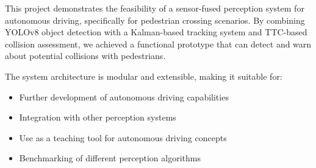 This project demonstrates the feasibility of a sensor-fused perception system for autonomous driving, specifically for pedestrian crossing scenarios. By combining YOLOv8 object detection with a Kalman-based tracking system and TTC-based collision assessment, we achieved a functional prototype that can detect and warn about potential collisions with pedestrians.

The system architecture is modular and extensible, making it suitable for:
\begin{itemize}
    \item Further development of autonomous driving capabilities
    \item Integration with other perception systems
    \item Use as a teaching tool for autonomous driving concepts
    \item Benchmarking of different perception algorithms
\end{itemize}
